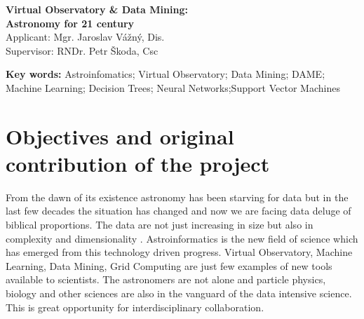 \documentclass[a4paper,10pt,oneside,onecolumn]{article}
\title{}
\author{Jaroslav Vážný}
\date{2011-09-22}
\begin{document}
\begin{center}
\vspace{-2cm}
\huge{\bf Virtual Observatory \& Data Mining:\\ Astronomy for 21 century}\\
\medskip
\large{Applicant: {Mgr. Jaroslav Vážný, Dis.}}\\
\large{Supervisor: RNDr. Petr Škoda, Csc}
\end{center}
\noindent\hrulefill

\noindent \textbf{Key words:} Astroinfomatics; Virtual Observatory; Data Mining;
DAME; Machine Learning; Decision Trees; Neural Networks;Support Vector
Machines

\section{Objectives and original contribution of the project}

\bigskip
\renewcommand{\LettrineFontHook}{\color{red}}


\lettrine[lines = 3, loversize=-0.1, lraise=0.1]{F}{}rom the dawn of
its existence astronomy has been starving for data but in the last few
decades the situation has changed and now we are facing data deluge of
biblical proportions. The data are not just increasing in size but
also in complexity and dimensionality
\cite{ballastroinformatics}. Astroinformatics is the new field of
science which has emerged from this technology driven progress.
Virtual Observatory, Machine Learning, Data Mining, Grid Computing are
just few examples of new tools available to scientists. The
astronomers are not alone and particle physics, biology and other
sciences are also in the vanguard of the data intensive science. This
is great opportunity for interdisciplinary collaboration.


\begin{figure}
\end{figure} 
\end{document}
